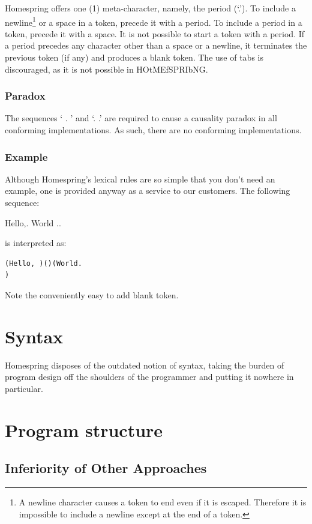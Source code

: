 \documentclass[10pt]{article}
\begin{document}
Homespring offers one (1) meta-character, namely, the period (`.').
To include a newline\footnote{A newline character causes a token to end even if it is escaped. Therefore it is impossible to include a newline except at the end of a token.} or a space in a token, precede it with a period.
To include a period in a token, precede it with a space. It is not possible to start a token with a period.
If a period precedes any character other than a space or a newline, it terminates the previous token (if any) and produces a blank token.
The use of tabs is discouraged, as it is not possible in HOtMEfSPRIbNG.

\subsubsection{Paradox}

The sequences `  . ' and `. .' are required to cause a causality paradox in all conforming implementations.
As such, there are no conforming implementations.

\subsubsection{Example}

Although Homespring's lexical rules are so simple that you don't need an example, one is provided anyway as a service to our customers.
The following sequence:

Hello,.   World ..

is interpreted as:

\begin{verbatim}
(Hello, )()(World.
)
\end{verbatim}

Note the conveniently easy to add blank token.

\section{Syntax}

Homespring disposes of the outdated notion of syntax, taking the burden of program design off the shoulders of the programmer and putting it nowhere in particular.

\section{Program structure}

\subsection{Inferiority of Other Approaches}
\end{document}
